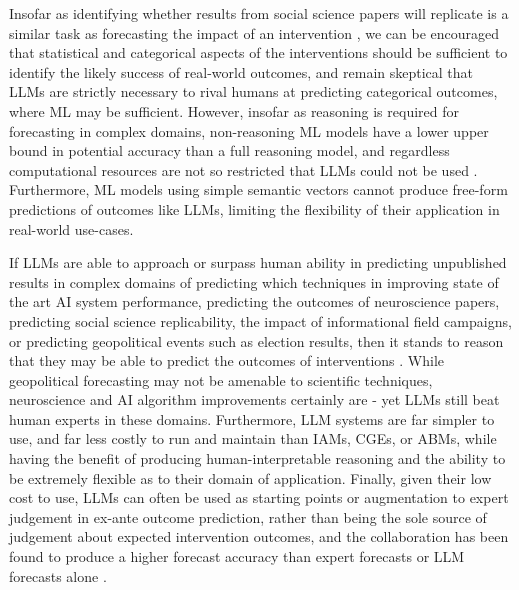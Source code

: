 \documentclass[12pt,a4paper]{article}
\begin{document}
Insofar as identifying whether results from social science papers will replicate is a similar task as forecasting the impact of an intervention \ABSTRACT, we can be encouraged that statistical and categorical aspects of the interventions should be sufficient to identify the likely success of real-world outcomes, and remain skeptical that LLMs are strictly necessary to rival humans at predicting categorical outcomes, where ML may be sufficient. However, insofar as reasoning is required for forecasting in complex domains, non-reasoning ML models have a lower upper bound in potential accuracy than a full reasoning model, and regardless computational resources are not so restricted that LLMs could not be used \ABSTRACT. Furthermore, ML models using simple semantic vectors cannot produce free-form predictions of outcomes like LLMs, limiting the flexibility of their application in real-world use-cases.

If LLMs are able to approach or surpass human ability in predicting unpublished results in complex domains of predicting which techniques in improving state of the art AI system performance, predicting the outcomes of neuroscience papers, predicting social science replicability, the impact of informational field campaigns, or predicting geopolitical events such as election results, then it stands to reason that they may be able to predict the outcomes of interventions \ABSTRACT. While geopolitical forecasting may not be amenable to scientific techniques, neuroscience and AI algorithm improvements certainly are - yet LLMs still beat human experts in these domains. Furthermore, LLM systems are far simpler to use, and far less costly to run and maintain than IAMs, CGEs, or ABMs, while having the benefit of producing human-interpretable reasoning and the ability to be extremely flexible as to their domain of application. Finally, given their low cost to use, LLMs can often be used as starting points or augmentation to expert judgement in ex-ante outcome prediction, rather than being the sole source of judgement about expected intervention outcomes, and the collaboration has been found to produce a higher forecast accuracy than expert forecasts or LLM forecasts alone .
\end{document}
